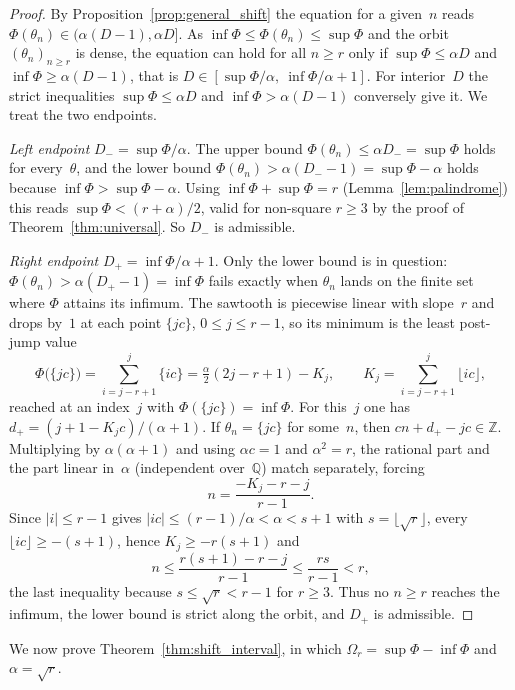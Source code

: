 \documentclass{birkjour}
\theoremstyle{definition}
\theoremstyle{remark}
\newcommand{\fl}[1]{\lfloor #1 \rfloor}
\newcommand{\frc}[1]{\{ #1 \}}
\begin{document}
\begin{proof}
By Proposition~\ref{prop:general_shift} the equation for a
given~$n$ reads $\Phi(\theta_{n})\in(\alpha(D-1),\alpha D]$.
As $\inf\Phi\le\Phi(\theta_{n})\le\sup\Phi$ and the orbit
$(\theta_{n})_{n\ge r}$ is dense, the equation can hold for
all $n\ge r$ only if $\sup\Phi\le\alpha D$ and
$\inf\Phi\ge\alpha(D-1)$, that is
$D\in[\sup\Phi/\alpha,\ \inf\Phi/\alpha+1]$. For interior~$D$
the strict inequalities $\sup\Phi\le\alpha D$ and
$\inf\Phi>\alpha(D-1)$ conversely give it. We treat
the two endpoints.

\emph{Left endpoint} $D_{-}=\sup\Phi/\alpha$. The upper bound
$\Phi(\theta_{n})\le\alpha D_{-}=\sup\Phi$ holds for
every~$\theta$, and the lower bound
$\Phi(\theta_{n})>\alpha(D_{-}{-}1)=\sup\Phi-\alpha$ holds
because $\inf\Phi>\sup\Phi-\alpha$. Using
$\inf\Phi+\sup\Phi=r$ (Lemma~\ref{lem:palindrome}) this reads
$\sup\Phi<(r+\alpha)/2$, valid for non-square $r\ge 3$ by the
proof of Theorem~\ref{thm:universal}. So $D_{-}$ is
admissible.

\emph{Right endpoint} $D_{+}=\inf\Phi/\alpha+1$. Only the
lower bound is in question:
$\Phi(\theta_{n})>\alpha(D_{+}{-}1)=\inf\Phi$ fails exactly
when $\theta_{n}$ lands on the finite set where $\Phi$ attains
its infimum. The sawtooth is piecewise linear with slope~$r$
and drops by~$1$ at each point $\frc{jc}$, $0\le j\le r-1$, so
its minimum is the least post-jump value
\[
  \Phi\!\bigl(\frc{jc}\bigr)=\sum_{i=j-r+1}^{j}\frc{ic}
  =\tfrac{\alpha}{2}(2j-r+1)-K_{j},
  \qquad K_{j}=\sum_{i=j-r+1}^{j}\fl{ic},
\]
reached at an index~$j$ with $\Phi(\frc{jc})=\inf\Phi$. For
this~$j$ one has $d_{+}=(j+1-K_{j}c)/(\alpha+1)$. If
$\theta_{n}=\frc{jc}$ for some~$n$, then
$cn+d_{+}-jc\in\mathbb{Z}$. Multiplying by $\alpha(\alpha+1)$
and using $\alpha c=1$ and $\alpha^{2}=r$, the rational part
and the part linear in~$\alpha$ (independent over~$\mathbb{Q}$)
match separately, forcing
\[
  n=\frac{-K_{j}-r-j}{\,r-1\,}.
\]
Since $|i|\le r-1$ gives $|ic|\le(r-1)/\alpha<\alpha<s+1$ with
$s=\fl{\sqrt{r}}$, every $\fl{ic}\ge-(s+1)$, hence
$K_{j}\ge-r(s+1)$ and
\[
  n\le\frac{r(s+1)-r-j}{r-1}\le\frac{rs}{r-1}<r,
\]
the last inequality because $s\le\sqrt{r}<r-1$ for $r\ge 3$.
Thus no $n\ge r$ reaches the infimum, the lower bound is
strict along the orbit, and $D_{+}$ is admissible.
\end{proof}

We now prove Theorem~\ref{thm:shift_interval}, in which
$\Omega_{r}=\sup\Phi-\inf\Phi$ and $\alpha=\sqrt{r}$.
\end{document}

